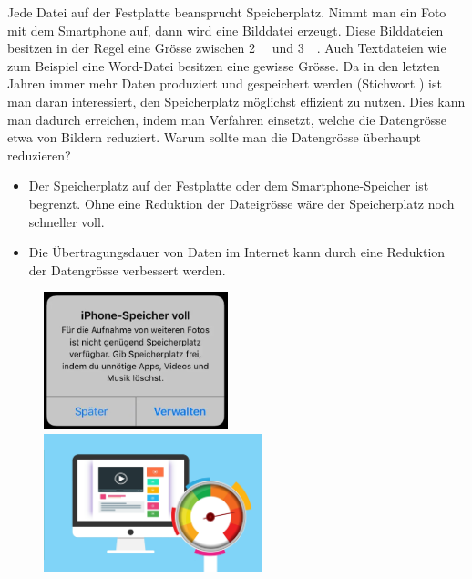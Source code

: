 Jede Datei auf der Festplatte beansprucht Speicherplatz. Nimmt man ein Foto mit dem Smartphone auf, dann wird eine Bilddatei erzeugt. Diese Bilddateien besitzen in der Regel eine Grösse zwischen \qty{2}{\mega\byte} und \qty{3}{\mega\byte}. Auch Textdateien wie zum Beispiel eine Word-Datei besitzen eine gewisse Grösse. Da in den letzten Jahren immer mehr Daten produziert und gespeichert werden (Stichwort ) ist man daran interessiert, den Speicherplatz möglichst effizient zu nutzen. Dies kann man dadurch erreichen, indem man Verfahren einsetzt, welche die Datengrösse etwa von Bildern reduziert. Warum sollte man die Datengrösse überhaupt reduzieren?

\begin{itemize}
\item Der Speicherplatz auf der Festplatte oder dem Smartphone-Speicher ist begrenzt. Ohne eine Reduktion der Dateigrösse wäre der Speicherplatz noch schneller voll.
\item Die Übertragungsdauer von Daten im Internet kann durch eine Reduktion der Datengrösse verbessert werden.
\end{itemize}

\begin{figure}[htb]
\centering
\begin{minipage}{0.45\textwidth}
\centering
\includegraphics[height=4cm]{iphone_speicher_voll}
\end{minipage}
\begin{minipage}{0.45\textwidth}
\centering
\includegraphics[height=4cm]{internet_speed}
\end{minipage}
\end{figure}

